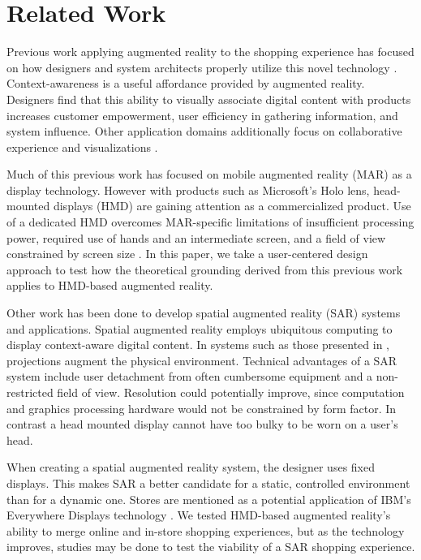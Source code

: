 \section{Related Work}

Previous work applying augmented reality to the shopping experience has focused on how designers and system architects properly utilize this novel technology \cite{ahn2015supporting,kourouthanassis2007enhancing,olsson2013expected,spreer2012improving,stoyanova2015comparison,zhu2004personalized}.  Context-awareness is a useful affordance provided by augmented reality.  Designers find that this ability to visually associate digital content with products increases customer empowerment, user efficiency in gathering information, and system influence.  Other application domains additionally focus on collaborative experience and visualizations \cite{esser2016head,santos2016augmented,truong2013today}.

Much of this previous work has focused on mobile augmented reality (MAR) as a display technology.  However with products such as Microsoft's Holo lens, head-mounted displays (HMD) are gaining attention as a commercialized product.  Use of a dedicated HMD overcomes MAR-specific limitations of insufficient processing power, required use of hands and an intermediate screen, and a field of view constrained by screen size \cite{bimber2005spatial}.  In this paper, we take a user-centered design approach to test how the theoretical grounding derived from this previous work applies to HMD-based augmented reality.

Other work has been done to develop spatial augmented reality (SAR) systems and applications.  Spatial augmented reality employs ubiquitous computing to display context-aware digital content.  In systems such as those presented in \cite{benko2015fovear,benko2014dyadic}, projections augment the physical environment.  Technical advantages of a SAR system include user detachment from often cumbersome equipment and a non-restricted field of view.  Resolution could potentially improve, since computation and graphics processing hardware would not be constrained by form factor.  In contrast a head mounted display cannot have too bulky to be worn on a user's head.

When creating a spatial augmented reality system, the designer uses fixed displays.  This makes SAR a better candidate for a static, controlled environment than for a dynamic one.  Stores are mentioned as a potential application of IBM's Everywhere Displays technology \cite{pinhanez2001everywhere}.  We tested HMD-based augmented reality's ability to merge online and in-store shopping experiences, but as the technology improves, studies may be done to test the viability of a SAR shopping experience.